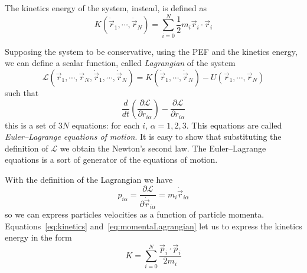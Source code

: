 The kinetics energy of the system, instead, is defined as
\begin{equation}
	K(\dot{\vec r}_1,\cdots,\dot{\vec r}_N) = \sum_{i=0}^N\frac{1}{2}m_i\vec r_i \cdot \vec r_i
	\label{eq:kinetics}
\end{equation}

Supposing the system to be conservative, using the \ac{PEF} and the kinetics energy, we can define a scalar function, called \textit{Lagrangian} of the system
\begin{equation}
	\mathcal{L}(\vec r_1, \cdots, \vec r_N, \dot{\vec r}_1,\cdots,\dot{\vec r}_N) = K(\dot{\vec r}_1,\cdots,\dot{\vec r}_N) - U(\vec r_1, \cdots, \vec r_N)
	\label{eq:lagrangian}
\end{equation}
such that
\begin{equation}
	\frac{d}{dt}\left ( \frac{\partial \mathcal{L}}{\partial \dot r_{i\alpha}}\right ) - \frac{\partial\mathcal{L}}{\partial r_{i\alpha}}
	\label{eq:EulerLagrange}
\end{equation}
this is a set of $3N$ equations: for each $i$, $\alpha=1,2,3$. This equations are called \textit{Euler--Lagrange equations of motion}. It is easy to show that substituting the definition of $\mathcal{L}$ we obtain the Newton's second law. The Euler--Lagrange equations is a sort of generator of the equations of motion.

With the definition of the Lagrangian we have
\begin{equation}
	p_{i\alpha} = \frac{\partial\mathcal{L}}{\partial \dot{\vec r}_{i\alpha}} = m_i\dot{\vec r}_{i\alpha}
	\label{eq:momentaLagrangian}
\end{equation}
so we can express particles velocities as a function of particle momenta. Equations~\eqref{eq:kinetics} and~\eqref{eq:momentaLagrangian} let us to express the kinetics energy in the form
\begin{equation}
	K = \sum_{i=0}^N \frac{\vec p_i \cdot \vec p_i}{2m_i}
	\label{eq:kineticsP}
\end{equation}

